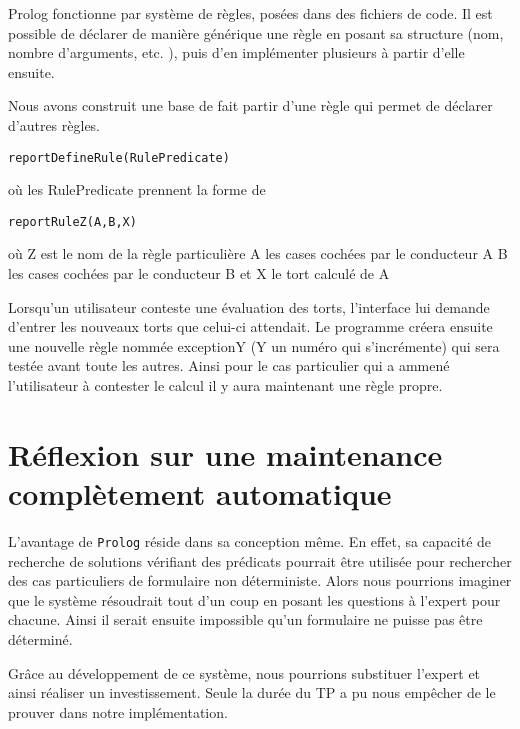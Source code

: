 Prolog fonctionne par système de règles, posées dans des fichiers de code. Il est possible de déclarer de manière générique une règle en posant sa structure (nom, nombre d'arguments, etc. ), puis d'en implémenter plusieurs à partir d'elle ensuite.

Nous avons construit une base de fait  partir d'une règle qui permet de déclarer d'autres règles.

\begin{lstlisting}[frame=single]
reportDefineRule(RulePredicate)
\end{lstlisting}

où les RulePredicate prennent la forme de 

\begin{lstlisting}[frame=single]
reportRuleZ(A,B,X) 
\end{lstlisting}

où Z est le nom de la règle particulière 
\newline
A les cases cochées par le conducteur A
\newline
B les cases cochées par le conducteur B
\newline
et X le tort calculé de A
\newline

Lorsqu'un utilisateur conteste une évaluation des torts, l'interface lui demande d'entrer les nouveaux torts que celui-ci attendait. Le programme créera ensuite une nouvelle règle nommée exceptionY (Y un numéro qui s'incrémente) qui sera testée avant toute les autres. Ainsi pour le cas particulier qui a ammené l'utilisateur à contester le calcul il y aura maintenant une règle propre. 



\section{Réflexion sur une maintenance complètement automatique}

L'avantage de \texttt{Prolog} réside dans sa conception même. En effet, sa capacité de recherche de solutions vérifiant des prédicats
pourrait être utilisée pour rechercher des cas particuliers de formulaire non déterministe. Alors nous pourrions imaginer que le
système résoudrait tout d'un coup en posant les questions à l'expert pour chacune. Ainsi il serait ensuite impossible qu'un
formulaire ne puisse pas être déterminé.

Grâce au développement de ce système, nous pourrions substituer l'expert et ainsi réaliser un investissement. Seule la durée du TP a pu nous empêcher de le prouver dans notre
implémentation.

